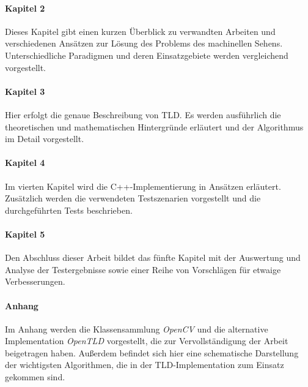 \paragraph{Kapitel 2}
  Dieses Kapitel gibt einen kurzen Überblick zu verwandten Arbeiten und verschiedenen Ansätzen zur Lösung des Problems des machinellen Sehens. Unterschiedliche Paradigmen und deren Einsatzgebiete werden vergleichend vorgestellt.

\paragraph{Kapitel 3 }
  Hier erfolgt die genaue Beschreibung von TLD. Es werden ausführlich die theoretischen und mathematischen Hintergründe erläutert und der Algorithmus im Detail vorgestellt.

\paragraph{Kapitel 4}
	Im vierten Kapitel wird die C++-Implementierung in Ansätzen erläutert. Zusätzlich werden die verwendeten Testszenarien vorgestellt und die durchgeführten Tests beschrieben.

\paragraph{Kapitel 5}
	Den Abschluss dieser Arbeit bildet das fünfte Kapitel mit der Auswertung und Analyse der Testergebnisse sowie einer Reihe von Vorschlägen für etwaige Verbesserungen.

\paragraph{Anhang}
	Im Anhang werden die Klassensammlung { \em OpenCV} und die alternative Implementation { \em OpenTLD} vorgestellt, die zur Vervollständigung der Arbeit beigetragen haben. Außerdem befindet sich hier eine schematische Darstellung der wichtigsten Algorithmen, die in der TLD-Implementation zum Einsatz gekommen sind.
